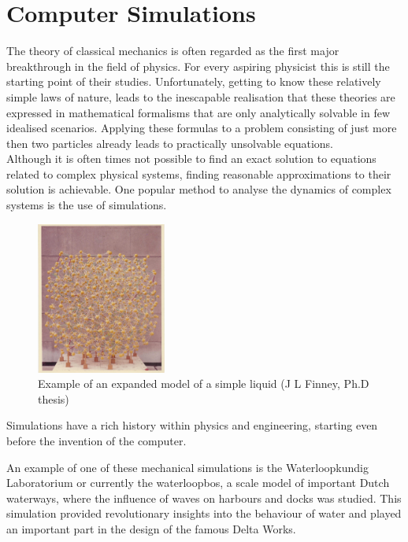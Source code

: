 \newpage
\section{Computer Simulations}

The theory of classical mechanics is often regarded as the first major breakthrough in
the field of physics. For every aspiring physicist this is still the starting point of
their studies. Unfortunately, getting to know these relatively simple laws of nature,
leads to the inescapable realisation that these theories are expressed in mathematical
formalisms that are only analytically solvable in few idealised scenarios. Applying these
formulas to a problem consisting of just more then two particles already leads to
practically unsolvable equations.\\

Although it is often times not possible to find an exact solution to equations
related to complex physical systems, finding reasonable approximations to their solution
is achievable. One popular method to analyse the dynamics of complex systems is the use
of simulations.\\

\begin{figure}
  \begin{center}
    \includegraphics[width=0.38\textwidth]{Figures/WaterModel.png}
  \end{center}
  \caption{Example of an expanded model of a simple liquid (J L Finney, Ph.D thesis)}
\end{figure}

Simulations have a rich history within physics and engineering, starting even before the
invention of the computer.

An example of one of these mechanical simulations is the Waterloopkundig Laboratorium
or
currently the waterloopbos, a scale model of important
Dutch waterways, where the influence of waves on harbours and docks was studied. This
simulation provided revolutionary insights into the behaviour of water and played an
important part in the design of the famous Delta Works.\\

